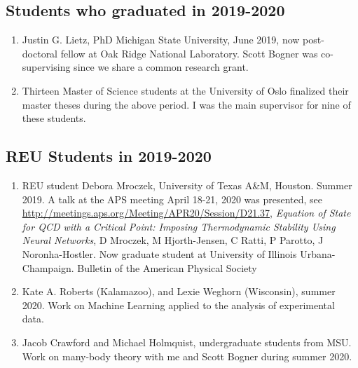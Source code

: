 \documentclass[prc,amsart,english,superscriptaddress,showpacs,floatfix]{revtex4}
\begin{document}
\subsection*{Students who graduated in 2019-2020}
\begin{enumerate}
\item Justin G. Lietz, PhD Michigan State University, June 2019, now post-doctoral fellow at Oak Ridge National Laboratory. Scott Bogner was co-supervising  since we share a common research grant.
\item Thirteen Master of Science students at the University of Oslo finalized their master theses during the above period. I was the main supervisor for nine of these students.
\end{enumerate}  

\subsection*{REU Students in 2019-2020}
\begin{enumerate}
\item REU student Debora Mroczek, University of Texas A\&M, Houston. Summer 2019. A talk at the APS meeting April 18-21, 2020 was presented, see \url{http://meetings.aps.org/Meeting/APR20/Session/D21.37}, {\em  Equation of State for QCD with a Critical Point: Imposing Thermodynamic Stability Using Neural Networks}, D Mroczek, M Hjorth-Jensen, C Ratti, P Parotto, J Noronha-Hostler. Now graduate student at  University of Illinois Urbana-Champaign.
Bulletin of the American Physical Society 
\item Kate A. Roberts (Kalamazoo), and Lexie Weghorn (Wisconsin), summer 2020. Work on Machine Learning applied to the analysis of experimental data.
\item Jacob Crawford and   Michael Holmquist, undergraduate students from MSU. Work on many-body theory with me and Scott Bogner during summer 2020.
\end{enumerate}  
\end{document}
